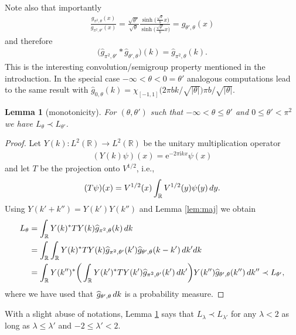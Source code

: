 \documentclass[11pt]{article}
\numberwithin{equation}{section}
\numberwithin{equation}{section}
\newtheorem{Lemma}[Theorem]{Lemma}
\newcommand{\e}{\mathrm{e}}
\newcommand{\ii}{\mathrm{i}}
\newcommand{\R}{\mathbb{R}}
\begin{document}
Note also that importantly
\begin{gather*}
\frac{g_{\pi^2,\theta}(x)}{g_{\pi^2,\theta'}(x)}
=\frac{\sqrt{\theta'}}{\sqrt{\theta}}\frac{\sinh\big(\frac{\sqrt{\theta}}{b}x\big)} {\sinh\big(\frac{\sqrt{\theta'}}{b}x\big)}=g_{\theta',\theta}(x)
\end{gather*}
and therefore
\begin{gather*}
\big(\widehat{g}_{\pi^2,\theta'}*\widehat{g}_{\theta',\theta}\big)(k)=\widehat{g}_{\pi^2,\theta}(k).
\end{gather*}
This is the interesting convolution/semigroup property mentioned in the introduction. In the special case $-\infty<\theta <0=\theta'$ analogous computations lead to the same result with $\widehat{g}_{0,\theta}(k)=\chi_{[-1,1]}\big(2\pi bk/\sqrt{|\theta|}\big)\pi b/\sqrt{|\theta|}$.

\begin{Lemma}[monotonicity]\label{Mon}
For $(\theta, \theta')$ such that $-\infty<\theta \le \theta'$ and $0\le\theta' <\pi^2$ we have $L_\theta\prec L_{\theta'}$.
\end{Lemma}

\begin{proof}
Let $Y(k)\colon L^2(\R)\to L^2(\R)$ be the unitary multiplication operator
\begin{gather*}
(Y(k)\psi)(x)=\e^{-2\pi \ii k x}\psi(x)
\end{gather*}
and let $T$ be the projection onto $V^{1/2}$, i.e.,
\begin{gather*}
(T\psi)(x)=V^{1/2} (x) \int_\R V^{1/2}(y) \psi(y) \, {\rm d} y.
\end{gather*}
Using $Y(k'+k'')=Y(k')Y(k'')$ and Lemma \ref{lem:maj} we obtain
\begin{align*}
L_{\theta}&=\int_\R Y(k)^*T Y(k) \widehat{g}_{\pi^2,\theta}(k)\, {\rm d} k
\\
&=\int_\R\int_{\R} Y(k)^*T Y(k) \widehat{g}_{\pi^2,\theta'}(k') \widehat{g}_{\theta',\theta}(k-k')\, {\rm d} k' {\rm d} k
\\
&=\int_\R Y(k'')^*\bigg(\int_{\R} Y(k')^*T Y(k') \widehat{g}_{\pi^2,\theta'}(k')\, {\rm d} k'\bigg)Y(k'') \widehat{g}_{\theta',\theta}(k'')\, {\rm d} k'' \prec L_{\theta'},
\end{align*}
where we have used that $\widehat{g}_{\theta',\theta} \, {\rm d} k$ is a probability measure.
\end{proof}

\begin{Remark}
With a slight abuse of notations, Lemma \ref{Mon} says that $L_{\lambda}\prec L_{\lambda'}$ for any $\lambda<2$ as long as $\lambda\le \lambda'$ and $-2\le\lambda' <2$.
\end{Remark}
\end{document}
